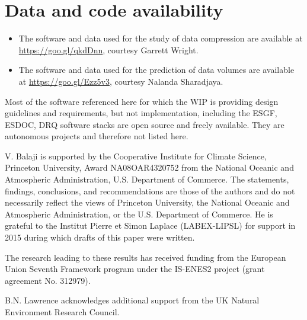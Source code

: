 \documentclass[gmd,manuscript]{copernicus}
\begin{document}
\section{Data and code availability}
\label{sec:code}

\begin{itemize}
\item The software and data used for the study of data compression are
  available at \url{https://goo.gl/qkdDnn}, courtesy Garrett Wright.
\item The software and data used for the prediction of data volumes
  are available at \url{https://goo.gl/Ezz5v3}, courtesy Nalanda
  Sharadjaya.
\end{itemize}

Most of the software referenced here for which the WIP is providing
design guidelines and requirements, but not implementation, including
the ESGF, ESDOC, DRQ software stacks are open source and freely
available. They are autonomous projects and therefore not listed here.

\begin{acknowledgements}
  V. Balaji is supported by the Cooperative Institute for Climate
  Science, Princeton University, Award NA08OAR4320752 from the
  National Oceanic and Atmospheric Administration, U.S. Department of
  Commerce. The statements, findings, conclusions, and recommendations
  are those of the authors and do not necessarily reflect the views of
  Princeton University, the National Oceanic and Atmospheric
  Administration, or the U.S. Department of Commerce. He is grateful
  to the Institut Pierre et Simon Laplace (LABEX-LIPSL) for support in
  2015 during which drafts of this paper were written.

  The research leading to these results has received funding from the
  European Union Seventh Framework program under the IS-ENES2 project
  (grant agreement No. 312979).

  B.N. Lawrence acknowledges additional support from the UK Natural
  Environment Research Council.
\end{acknowledgements}



\end{document}
